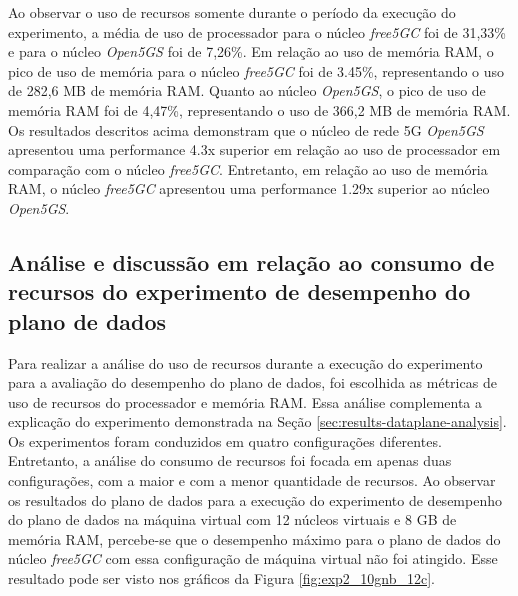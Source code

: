 Ao observar o uso de recursos somente durante o período da execução do experimento, a média de uso de processador para o núcleo \textit{free5GC} foi de 31,33\% e para o núcleo \textit{Open5GS} foi de 7,26\%.
Em relação ao uso de memória RAM, o pico de uso de memória para o núcleo \textit{free5GC} foi de 3.45\%, representando o uso de 282,6 MB de memória RAM.
Quanto ao núcleo \textit{Open5GS}, o pico de uso de memória RAM foi de 4,47\%, representando o uso de 366,2 MB de memória RAM.
Os resultados descritos acima demonstram que o núcleo de rede 5G \textit{Open5GS} apresentou uma performance 4.3x superior em relação ao uso de processador em comparação com o núcleo \textit{free5GC}.
Entretanto, em relação ao uso de memória RAM, o núcleo \textit{free5GC} apresentou uma performance 1.29x superior ao núcleo \textit{Open5GS}.


\subsection{Análise e discussão em relação ao consumo de recursos do experimento de desempenho do plano de dados}

Para realizar a análise do uso de recursos durante a execução do experimento para a avaliação do desempenho do plano de dados, foi escolhida as métricas de uso de recursos do processador e memória RAM.
Essa análise complementa a explicação do experimento demonstrada na Seção \ref{sec:results-dataplane-analysis}.
Os experimentos foram conduzidos em quatro configurações diferentes.
Entretanto, a análise do consumo de recursos foi focada em apenas duas configurações, com a maior e com a menor quantidade de recursos.
Ao observar os resultados do plano de dados para a execução do experimento de desempenho do plano de dados na máquina virtual com 12 núcleos virtuais e 8 GB de memória RAM, percebe-se que o desempenho máximo para o plano de dados do núcleo \textit{free5GC} com essa configuração de máquina virtual não foi atingido.
Esse resultado pode ser visto nos gráficos da Figura \ref{fig:exp2_10gnb_12c}.


